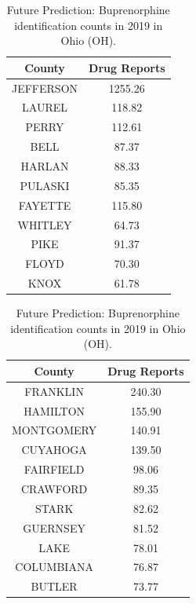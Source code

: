 \documentclass{mcmthesis}
\begin{document}
\begin{table}[H]
 \caption{Source Dedection and Future Prediction}
  \label{tbl:main}
  \begin{subtable}[t]{0.45\linewidth}
    \centering
     \caption{Source Dedection: Hydrocodone identification counts in 2008 in  Kentucky (KY).}
    \label{tab:2008}
    \begin{tabular}{|c|c|}
        \hline
        County  &  Drug Reports  \\\hline
        JEFFERSON &  1255.26\\
        LAUREL &  118.82\\
        PERRY & 112.61\\
        BELL &  87.37\\
        HARLAN & 88.33\\
        PULASKI &  85.35\\
        FAYETTE &  115.80\\
        WHITLEY &  64.73\\
        PIKE &  91.37\\
        FLOYD &  70.30\\
        KNOX & 61.78\\
        \hline
    \end{tabular}
   

  \end{subtable}\hfill
  \begin{subtable}[t]{0.45\linewidth}
    \centering
    \caption{Future Prediction: Buprenorphine identification counts in 2019 in Ohio (OH).}
    \label{2019}
    \begin{tabular}{|c|c|}
        \hline
        County &   Drug Reports\\\hline       
        FRANKLIN & 240.30\\
        HAMILTON & 155.90\\
        MONTGOMERY & 140.91\\
        CUYAHOGA & 139.50\\
        FAIRFIELD & 98.06\\
        CRAWFORD & 89.35\\
        STARK & 82.62\\
        GUERNSEY & 81.52\\
        LAKE & 78.01\\
        COLUMBIANA &76.87\\
        BUTLER &73.77\\
        \hline
    \end{tabular}
  \end{subtable}
\end{table}
\end{document}
